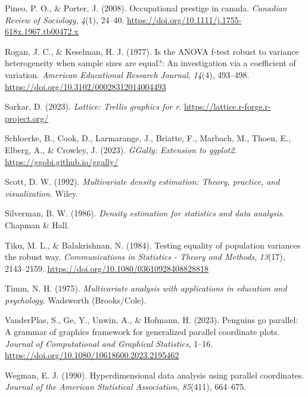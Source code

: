 \documentclass[
  letterpaper,
  10pt,
  krantz2]{krantz}
\newlength{\cslhangindent}
\newlength{\cslentryspacingunit} %
\newenvironment{CSLReferences}[2] %
 {%
  \setlength{\parindent}{0pt}
  \ifodd #1
  \let\oldpar\par
  \def\par{\hangindent=\cslhangindent\oldpar}
  \fi
  \setlength{\parskip}{#2\cslentryspacingunit}
 }%
 {}
\begin{document}
\begin{CSLReferences}{1}{0}
\leavevmode{}%
Pineo, P. O., \& Porter, J. (2008). Occupational prestige in canada.
\emph{Canadian Review of Sociology}, \emph{4}(1), 24--40.
\url{https://doi.org/10.1111/j.1755-618x.1967.tb00472.x}

\leavevmode{}%
Rogan, J. C., \& Keselman, H. J. (1977). Is the {ANOVA} f-test robust to
variance heterogeneity when sample sizes are equal?: An investigation
via a coefficient of variation. \emph{American Educational Research
Journal}, \emph{14}(4), 493--498.
\url{https://doi.org/10.3102/00028312014004493}

\leavevmode{}%
Sarkar, D. (2023). \emph{Lattice: Trellis graphics for r}.
\url{https://lattice.r-forge.r-project.org/}

\leavevmode{}%
Schloerke, B., Cook, D., Larmarange, J., Briatte, F., Marbach, M.,
Thoen, E., Elberg, A., \& Crowley, J. (2023). \emph{GGally: Extension to
ggplot2}. \url{https://ggobi.github.io/ggally/}

\leavevmode{}%
Scott, D. W. (1992). \emph{Multivariate density estimation: Theory,
practice, and visualization}. Wiley.

\leavevmode{}%
Silverman, B. W. (1986). \emph{Density estimation for statistics and
data analysis}. Chapman \& Hall.

\leavevmode{}%
Tiku, M. L., \& Balakrishnan, N. (1984). Testing equality of population
variances the robust way. \emph{Communications in Statistics - Theory
and Methods}, \emph{13}(17), 2143--2159.
\url{https://doi.org/10.1080/03610928408828818}

\leavevmode{}%
Timm, N. H. (1975). \emph{Multivariate analysis with applications in
education and psychology}. Wadsworth (Brooks/Cole).

\leavevmode{}%
VanderPlas, S., Ge, Y., Unwin, A., \& Hofmann, H. (2023). Penguins go
parallel: A grammar of graphics framework for generalized parallel
coordinate plots. \emph{Journal of Computational and Graphical
Statistics}, 1--16. \url{https://doi.org/10.1080/10618600.2023.2195462}

\leavevmode{}%
Wegman, E. J. (1990). Hyperdimensional data analysis using parallel
coordinates. \emph{Journal of the American Statistical Association},
\emph{85}(411), 664--675.


\end{CSLReferences}
\end{document}

